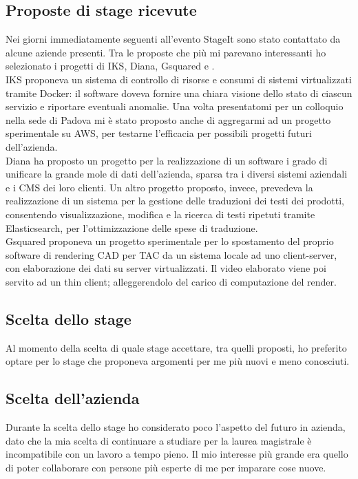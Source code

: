    \subsection{Proposte di stage ricevute}
   Nei giorni immediatamente seguenti all'evento StageIt sono stato contattato da alcune aziende presenti. Tra le proposte che più mi parevano interessanti ho selezionato i progetti di IKS, Diana, Gsquared e \nomeAzienda{}.
   \\
   IKS proponeva un sistema di controllo di risorse e consumi di sistemi virtualizzati tramite \gls{Docker}: il software doveva fornire una chiara visione dello stato di ciascun servizio e riportare eventuali anomalie. Una volta presentatomi per un colloquio nella sede di Padova mi è stato proposto anche di aggregarmi ad un progetto sperimentale su \gls{AWS}, per testarne l'efficacia per possibili progetti futuri dell'azienda.
   \\
   Diana ha proposto un progetto per la realizzazione di un software i grado di unificare la grande mole di dati dell'azienda, sparsa tra i diversi sistemi aziendali e i \gls{CMS} dei loro clienti. Un altro progetto proposto, invece, prevedeva la realizzazione di un sistema per la gestione delle traduzioni dei testi dei prodotti, consentendo visualizzazione, modifica e la ricerca di testi ripetuti tramite Elasticsearch, per l'ottimizzazione delle spese di traduzione.
   \\
   Gsquared proponeva un progetto sperimentale per lo spostamento del proprio software di rendering \gls{CAD} per \gls{TAC} da un sistema locale ad uno client-server, con elaborazione dei dati su server virtualizzati. Il video elaborato viene poi servito ad un \gls{thin client}; alleggerendolo del carico di computazione del render.
   
   \subsection{Scelta dello stage}
   Al momento della scelta di quale stage accettare, tra quelli proposti, ho preferito optare per lo stage che proponeva argomenti per me più nuovi e meno conosciuti.

   \subsection{Scelta dell'azienda}
   Durante la scelta dello stage ho considerato poco l'aspetto del futuro in azienda, dato che la mia scelta di continuare a studiare per la laurea magistrale è incompatibile con un lavoro a tempo pieno. Il mio interesse più grande era quello di poter collaborare con persone più esperte di me per imparare cose nuove.


